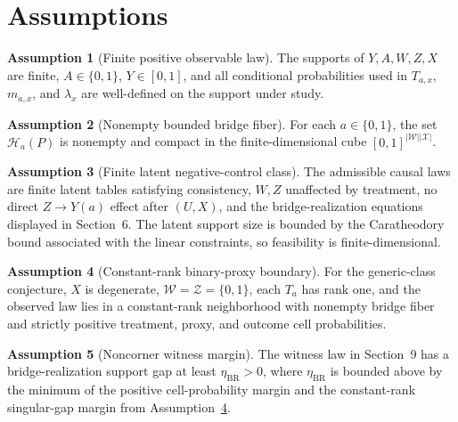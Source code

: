 \documentclass[11pt]{article}
\theoremstyle{definition}
\newtheorem{assumption}{Assumption}
\theoremstyle{plain}
\theoremstyle{remark}
\begin{document}
\section{Assumptions}
\begin{assumption}[Finite positive observable law]\label{ass:finite-positive}
The supports of \(Y,A,W,Z,X\) are finite, \(A\in\{0,1\}\), \(Y\in[0,1]\), and
all conditional probabilities used in \(T_{a,x}\), \(m_{a,x}\), and
\(\lambda_x\) are well-defined on the support under study.
\end{assumption}

\begin{assumption}[Nonempty bounded bridge fiber]\label{ass:bridge-nonempty}
For each \(a\in\{0,1\}\), the set \(\mathcal H_a(P)\) is nonempty and compact
in the finite-dimensional cube \([0,1]^{|\mathcal W||\mathcal X|}\).
\end{assumption}

\begin{assumption}[Finite latent negative-control class]\label{ass:latent-class}
The admissible causal laws are finite latent tables satisfying consistency,
\(W,Z\) unaffected by treatment, no direct \(Z\to Y(a)\) effect after
\((U,X)\), and the bridge-realization equations displayed in Section~6.
The latent support size is bounded by the Caratheodory bound associated with
the linear constraints, so feasibility is finite-dimensional.
\end{assumption}

\begin{assumption}[Constant-rank binary-proxy boundary]\label{ass:binary-boundary}
For the generic-class conjecture, \(X\) is degenerate,
\(\mathcal W=\mathcal Z=\{0,1\}\), each \(T_a\) has rank one, and the observed
law lies in a constant-rank neighborhood with nonempty bridge fiber and
strictly positive treatment, proxy, and outcome cell probabilities.
\end{assumption}

\begin{assumption}[Noncorner witness margin]\label{ass:witness-margin}
The witness law in Section~9 has a bridge-realization support gap at least
\(\eta_{\mathrm{BR}}>0\), where \(\eta_{\mathrm{BR}}\) is bounded above by the
minimum of the positive cell-probability margin and the constant-rank
singular-gap margin from Assumption~\ref{ass:binary-boundary}.
\end{assumption}
\end{document}
